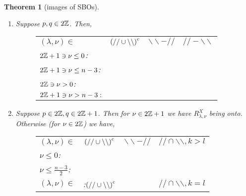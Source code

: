 \documentclass[10pt]{article} %
\newtheorem{theorem}{Theorem}
\theoremstyle{definition}
\newcommand{\even}{2\Z}
\newcommand{\odd}{2\Z+1}
\newcommand{\bb}{\backslash\backslash}
\renewcommand{\ss}{//}
\begin{document}
\begin{theorem}[images of SBOs]
\begin{enumerate}
\begin{figure}[H]
\begin{tabular}{m{3cm}ccc}
		\end{tabular}
		\end{figure}
	\item Suppose $p,q\in\even$. Then,
		\begin{figure}[H]
			\centering
			\begin{tabular}{m{3cm}ccc}
			$(\lambda,\nu)\in$&$\mybra{\ss\cup\bb}^c$ & $\bb-\ss$  & $\ss-\bb$\\[15pt]
			\vspace{-3cm}$\odd\ni\nu\le0$:&\\[15pt]
			\vspace{-3cm}$\odd\ni\nu\le n-3$:&\\[15pt]
			\vspace{-3cm}$\even\ni\nu>0$:&\\[15pt]
			\vspace{-3cm}$\odd\ni\nu>n-3:$&\\[15pt]
		\end{tabular}
		\end{figure}
	\item Suppose $p\in\even,q\in\odd$. Then for $\nu\in\odd$ we have $R_{\lambda,\nu}^X$ being onto. Otherwise (for $\nu\in\even$) we have,
	  \begin{figure}[H]
	    \hskip-1.1cm\noindent\begin{tabular}{m{3cm}ccc}
	      $(\lambda,\nu)\in$&$\left(//\cup\backslash\backslash\right)^c$ & $\backslash\backslash-//$  & $//\cap\backslash\backslash,k> l$\\[15pt]
	      \vspace{-3cm}$\nu\leq0$:&\\[15pt]
	      \vspace{-3cm}$\nu\leq\frac{n-3}{2}$:&\\[25pt]
              $(\lambda,\nu)\in$&:$\left(//\cup\backslash\backslash\right)^c$ && $//\cap\backslash\backslash,k=l$\\[15pt]

\end{tabular}
\end{figure}
\end{enumerate}
\end{theorem}
\end{document}
